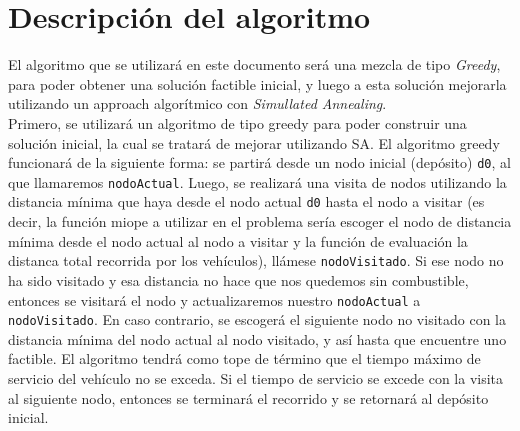 \documentclass[letter, 10pt]{article}
\begin{document}
\section{Descripción del algoritmo}

El algoritmo que se utilizará en este documento será una mezcla de tipo \emph{Greedy}, para poder obtener una solución factible inicial, y luego a esta solución mejorarla utilizando un approach algorítmico con \emph{Simullated Annealing}.\\

Primero, se utilizará un algoritmo de tipo greedy para poder construir una solución inicial, la cual se tratará de mejorar utilizando SA. El algoritmo greedy funcionará de la siguiente forma: se partirá desde un nodo inicial (depósito) \texttt{d0}, al que llamaremos \texttt{nodoActual}. Luego, se realizará una visita de nodos utilizando la distancia mínima que haya desde el nodo actual \texttt{d0} hasta el nodo a visitar (es decir, la función  miope a utilizar en el problema sería escoger el nodo de distancia mínima desde el nodo actual al nodo a visitar y la función de evaluación la distanca total recorrida por los vehículos), llámese \texttt{nodoVisitado}. Si ese nodo no ha sido visitado y esa distancia no hace que nos quedemos sin combustible, entonces se visitará el nodo y actualizaremos nuestro \texttt{nodoActual} a \texttt{nodoVisitado}. En caso contrario, se escogerá el siguiente nodo no visitado con la distancia mínima del nodo actual al nodo visitado, y así hasta que encuentre uno factible. El algoritmo tendrá como tope de término que el tiempo máximo de servicio del vehículo no se exceda. Si el tiempo de servicio se excede con la visita al siguiente nodo, entonces se terminará el recorrido y se retornará al depósito inicial.
\end{document}
